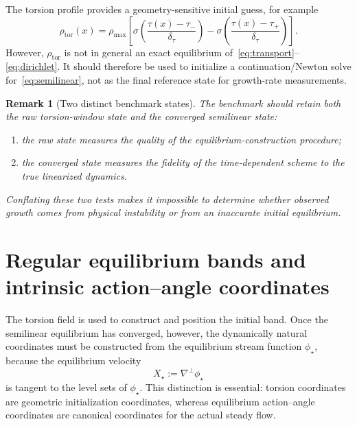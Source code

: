 \documentclass[11pt,a4paper]{article}
\newtheorem{remark}{Remark}[section]
\begin{document}
The torsion profile provides a geometry-sensitive initial guess, for example
\begin{equation}
  \rho_{\mathrm{tor}}(x)
  =\rho_{\max}
  \left[
    \sigma\!\left(\frac{\tau(x)-\tau_-}{\delta_\tau}\right)
    -
    \sigma\!\left(\frac{\tau(x)-\tau_+}{\delta_\tau}\right)
  \right].
  \label{eq:raw-torsion-profile}
\end{equation}
However, $\rho_{\mathrm{tor}}$ is not in general an exact equilibrium of~\eqref{eq:transport}--\eqref{eq:dirichlet}. It should therefore be used to initialize a continuation/Newton solve for~\eqref{eq:semilinear}, not as the final reference state for growth-rate measurements.

\begin{remark}[Two distinct benchmark states]
The benchmark should retain both the raw torsion-window state and the converged semilinear state:
\begin{enumerate}[label=(\roman*)]
  \item the raw state measures the quality of the equilibrium-construction procedure;
  \item the converged state measures the fidelity of the time-dependent scheme to the true linearized dynamics.
\end{enumerate}
Conflating these two tests makes it impossible to determine whether observed growth comes from physical instability or from an inaccurate initial equilibrium.
\end{remark}

\section{Regular equilibrium bands and intrinsic action--angle coordinates}
\label{sec:action-angle}

The torsion field is used to construct and position the initial band. Once the semilinear equilibrium has converged, however, the dynamically natural coordinates must be constructed from the equilibrium stream function $\phi_\star$, because the equilibrium velocity
\begin{equation}
  X_\star:=\nabla^\perp\phi_\star
  \label{eq:equilibrium-vector-field}
\end{equation}
is tangent to the level sets of $\phi_\star$. This distinction is essential: torsion coordinates are geometric initialization coordinates, whereas equilibrium action--angle coordinates are canonical coordinates for the actual steady flow.
\end{document}
